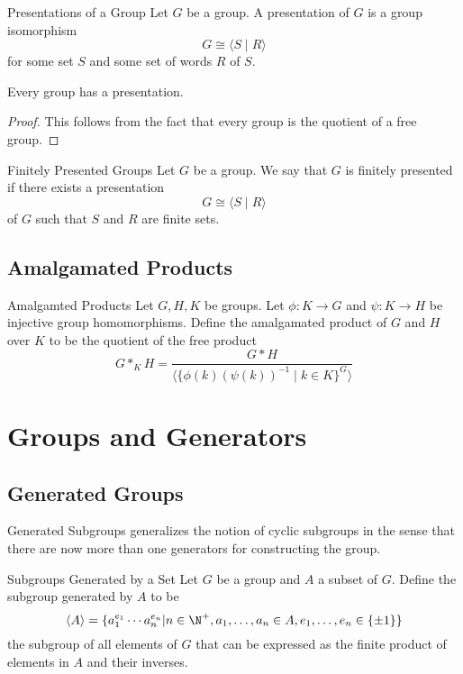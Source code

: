 \documentclass[a4paper]{article}
\begin{document}
\begin{defn}{Presentations of a Group}{} Let $G$ be a group. A presentation of $G$ is a group isomorphism $$G\cong\langle S\;|\;R\rangle$$ for some set $S$ and some set of words $R$ of $S$. 
\end{defn}

\begin{prp}{}{} Every group has a presentation. \tcbline
\begin{proof}
This follows from the fact that every group is the quotient of a free group. 
\end{proof}
\end{prp}

\begin{defn}{Finitely Presented Groups}{} Let $G$ be a group. We say that $G$ is finitely presented if there exists a presentation $$G\cong\langle S\;|\;R\rangle$$ of $G$ such that $S$ and $R$ are finite sets. 
\end{defn}

\subsection{Amalgamated Products}
\begin{defn}{Amalgamted Products}{} Let $G,H,K$ be groups. Let $\phi:K\to G$ and $\psi:K\to H$ be injective group homomorphisms. Define the amalgamated product of $G$ and $H$ over $K$ to be the quotient of the free product $$G\ast_KH=\frac{G\ast H}{\langle\{\phi(k)(\psi(k))^{-1}\;|\;k\in K\}^G\rangle}$$
\end{defn}

\pagebreak
\section{Groups and Generators}
\subsection{Generated Groups}
Generated Subgroups generalizes the notion of cyclic subgroups in the sense that there are now more than one generators for constructing the group. 

\begin{defn}{Subgroups Generated by a Set}{} Let $G$ be a group and $A$ a subset of $G$. Define the subgroup generated by $A$ to be $$\langle A\rangle=\{a_1^{e_1}\cdots a_n^{e_n}|n\in\N^+, a_1,\dots,a_n\in A, e_1,\dots,e_n\in\{\pm1\}\}$$ the subgroup of all elements of $G$ that can be expressed as the finite product of elements in $A$ and their inverses. 
\end{defn}
\end{document}
